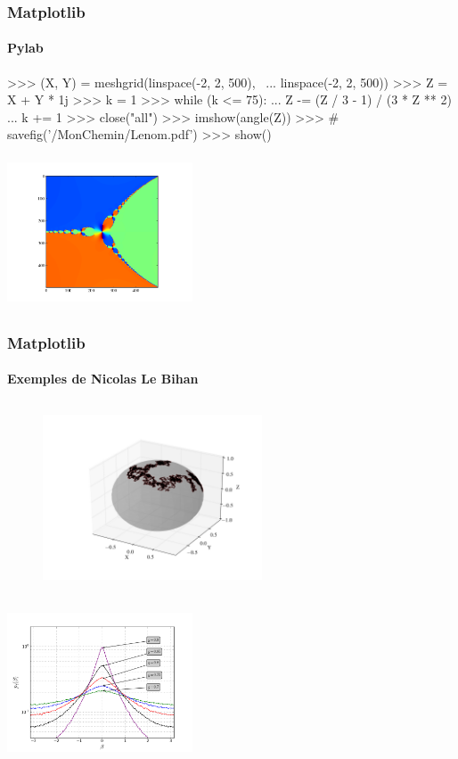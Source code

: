 \begin{frame}[fragile]
\frametitle{Matplotlib}
\framesubtitle{Pylab}
\begin{minipage}{0.58\linewidth}
\begin{pythonConsole}
>>> (X, Y) = meshgrid(linspace(-2, 2, 500), \
... linspace(-2, 2, 500))
>>> Z = X + Y * 1j
>>> k = 1
>>> while (k <= 75):
...    Z -= (Z / 3 - 1) / (3 * Z ** 2)
...	   k += 1
>>> close("all")	
>>> imshow(angle(Z))
>>> # savefig('/MonChemin/Lenom.pdf')
>>> show()
\end{pythonConsole}
\end{minipage}
\begin{minipage}{0.4\linewidth}
\includegraphics[width=5.5cm,height=4.5cm]{fig/fractal.png}
\end{minipage}
\end{frame}
\begin{frame}
\frametitle{Matplotlib}
\framesubtitle{Exemples de Nicolas Le Bihan}
\begin{minipage}{0.4\linewidth}
\begin{figure}
\includegraphics[width=6.5cm,height=5.5cm]{fig/BrownSphere.png}
\end{figure}
\end{minipage}
\hspace{1cm}
\begin{minipage}{0.4\linewidth}
\includegraphics[width=5.5cm,height=4.5cm]{fig/Distrib.png}
\end{minipage}
\end{frame}
